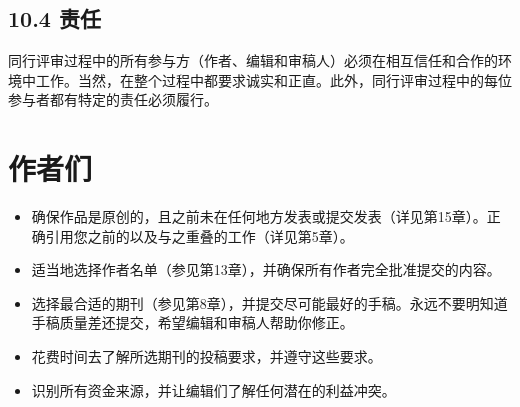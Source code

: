 \subsection*{10.4 责任}
同行评审过程中的所有参与方（作者、编辑和审稿人）必须在相互信任和合作的环境中工作。当然，在整个过程中都要求诚实和正直。此外，同行评审过程中的每位参与者都有特定的责任必须履行。

\section*{作者们}
\begin{itemize}
\item 确保作品是原创的，且之前未在任何地方发表或提交发表（详见第15章）。正确引用您之前的以及与之重叠的工作（详见第5章）。
\item 适当地选择作者名单（参见第13章），并确保所有作者完全批准提交的内容。
\item 选择最合适的期刊（参见第8章），并提交尽可能最好的手稿。永远不要明知道手稿质量差还提交，希望编辑和审稿人帮助你修正。
\item 花费时间去了解所选期刊的投稿要求，并遵守这些要求。
\item 识别所有资金来源，并让编辑们了解任何潜在的利益冲突。
\end{itemize}

